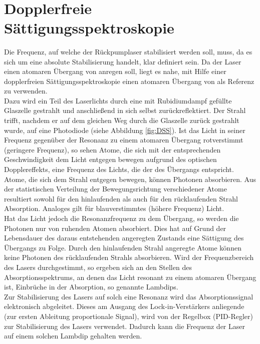 \documentclass[
class=book,
accentcolor=1b,
custommargins=geometry,
fontsize=11pt,
thesis={type=Versuchsanleitung},
ruledheaders=all,
headline=false,
instbox=false,
marginpar=false,
title=small,
ignore-missing-data=true,
twoside=false,
logofile=apqdesign/tuda_logo.pdf,
pdfa=false %
]{apqpub}
\newtheorem{frage}[satz]{Frage}
\newcommand{\gqq}[1]{\glqq{}#1\grqq{}}
\begin{document}
			\\
				
				\section{Dopplerfreie Sättigungsspektroskopie}			
				Die Frequenz, auf welche der Rückpumplaser stabilisiert werden soll, muss, da es sich um eine absolute Stabilisierung handelt, klar definiert sein. 
				Da der Laser einen atomaren Übergang von  anregen soll, liegt es nahe, mit Hilfe einer dopplerfreien Sättigungsspektroskopie einen atomaren Übergang von  als Referenz zu verwenden.\\
				Dazu wird ein Teil des Laserlichts durch eine mit Rubidiumdampf gefüllte Glaszelle gestrahlt und anschließend in sich selbst zurückreflektiert. 
				Der Strahl trifft, nachdem er auf dem gleichen Weg durch die Glaszelle zurück gestrahlt wurde, auf eine Photodiode (siehe Abbildung \ref{fig:DSS}). 
				Ist das Licht in seiner Frequenz gegenüber der Resonanz zu einem atomaren Übergang rotverstimmt (geringere Frequenz), so \gqq{sehen} Atome, die sich mit der entsprechenden Geschwindigkeit dem Licht entgegen bewegen aufgrund des optischen Dopplereffekts, eine Frequenz des Lichts, die der des Übergangs entspricht. Atome, die sich dem Strahl entgegen bewegen, können Photonen absorbieren. 
				Aus der statistischen Verteilung der Bewegungsrichtung verschiedener Atome resultiert sowohl für den hinlaufenden als auch für den rücklaufenden Strahl Absorption. 
				Analoges gilt für blauverstimmtes (höhere Frequenz) Licht.\\
				Hat das Licht jedoch die Resonanzfrequenz zu dem Übergang, so werden die Photonen nur von ruhenden Atomen absorbiert. Dies hat auf Grund der Lebensdauer des daraus entstehenden angeregten Zustands eine Sättigung des Übergangs zu Folge. 
				Durch den hinlaufenden Strahl angeregte Atome können keine Photonen des rücklaufenden Strahls absorbieren. 
				Wird der Frequenzbereich des Lasers durchgestimmt, so ergeben sich an den Stellen des Absorptionsspektrums, an denen das Licht resonant zu einem atomaren Übergang ist, Einbrüche in der Absorption, so genannte \gqq{Lambdips}.\\
				Zur Stabilisierung des Lasers auf solch eine Resonanz wird das Absorptionssignal elektronisch abgeleitet. 
				Dieses am Ausgang des Lock-in-Verstärkers anliegende (zur ersten Ableitung proportionale Signal), wird von der Regelbox (PID-Regler) zur Stabilisierung des Lasers verwendet. Dadurch kann die Frequenz der Laser auf einem solchen Lambdip \gqq{gehalten} werden.\\
				
\end{document}
